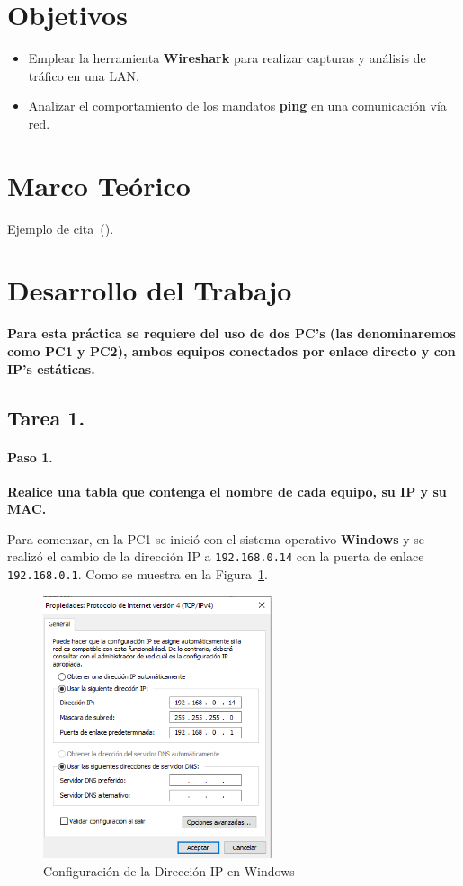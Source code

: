 \section{Objetivos}
    \begin{itemize}
        \item Emplear la herramienta \textbf{Wireshark} para realizar capturas y análisis de tráfico en una LAN.
        \item Analizar el comportamiento de los mandatos \textbf{ping} en una comunicación vía red.
    \end{itemize}
\section{Marco Teórico}
    Ejemplo de cita~(\cite{buffett84}).

\newpage
\section{Desarrollo del Trabajo}
    \textbf{Para esta práctica se requiere del uso de dos PC's (las denominaremos como PC1 y PC2), ambos equipos conectados por enlace directo y con IP's estáticas.}

    \subsection{Tarea 1.}
        \paragraph{Paso 1.}
        \textbf{Realice una tabla que contenga el nombre de cada equipo, su IP y su MAC.}

        Para comenzar, en la PC1 se inició con el sistema operativo \textbf{Windows} y se realizó el cambio de la dirección IP a \texttt{192.168.0.14} con la puerta de enlace \texttt{192.168.0.1}. Como se muestra en la Figura~\ref{fig:ip_windows}.

        \begin{figure}[H]
            \centering
            \includegraphics[width=0.6\textwidth]{img/cambiar_IP_Windows.png}
            \caption{Configuración de la Dirección IP en Windows}
            \label{fig:ip_windows}
        \end{figure}


